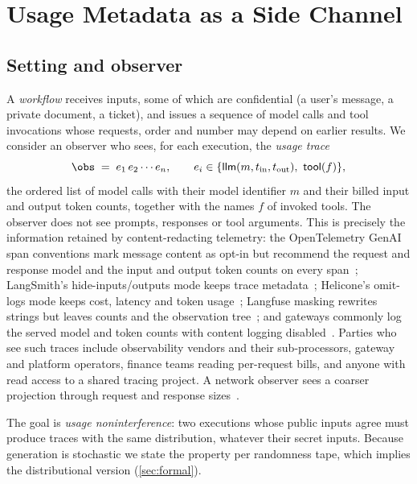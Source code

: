 \section{Usage Metadata as a Side Channel}\label{sec:threat}

\subsection{Setting and observer}\label{sec:observer}

A \emph{workflow} receives inputs, some of which are confidential (a user's message, a private document, a ticket), and issues a sequence of model calls and tool invocations whose requests, order and number may depend on earlier results. We consider an observer who sees, for each execution, the \emph{usage trace}
\[
  \obs \;=\; e_1\, e_2 \cdots e_n, \qquad e_i \in \{\mathsf{llm}(m, t_{\mathrm{in}}, t_{\mathrm{out}}),\ \mathsf{tool}(f)\},
\]
the ordered list of model calls with their model identifier $m$ and their billed input and output token counts, together with the names $f$ of invoked tools. The observer does not see prompts, responses or tool arguments. This is precisely the information retained by content-redacting telemetry: the OpenTelemetry GenAI span conventions mark message content as opt-in but recommend the request and response model and the input and output token counts on every span~\cite{otel2026genai}; LangSmith's hide-inputs/outputs mode keeps trace metadata~\cite{langsmith2026mask}; Helicone's omit-logs mode keeps cost, latency and token usage~\cite{helicone2026omit}; Langfuse masking rewrites strings but leaves counts and the observation tree~\cite{langfuse2026mask}; and gateways commonly log the served model and token counts with content logging disabled~\cite{chen2026routing}. Parties who see such traces include observability vendors and their sub-processors, gateway and platform operators, finance teams reading per-request bills, and anyone with read access to a shared tracing project. A network observer sees a coarser projection through request and response sizes~\cite{weiss2024keylog,zhang2025agentprint}.

The goal is \emph{usage noninterference}: two executions whose public inputs agree must produce traces with the same distribution, whatever their secret inputs. Because generation is stochastic we state the property per randomness tape, which implies the distributional version (\cref{sec:formal}).


